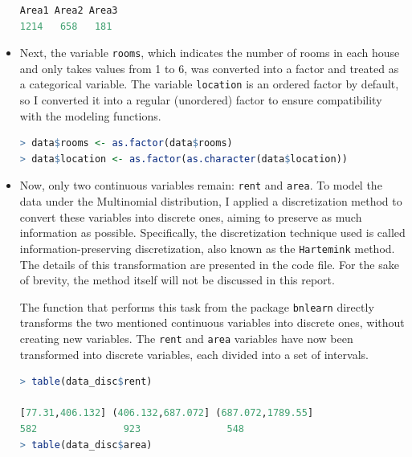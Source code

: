 \documentclass[15pt,a4paper]{report}
\begin{document}
\begin{itemize}
\begin{lstlisting}[language=R]
Area1 Area2 Area3 
1214   658   181 
	\end{lstlisting}
	\item Next, the variable \lstinline[language=R]|rooms|, which indicates the number of rooms in each house and only takes values from 1 to 6, was converted into a factor and treated as a categorical variable. The variable \lstinline[language=R]|location| is an ordered factor by default, so I converted it into a regular (unordered) factor to ensure compatibility with the modeling functions.
\begin{lstlisting}[language=R]
> data$rooms <- as.factor(data$rooms)
> data$location <- as.factor(as.character(data$location))
\end{lstlisting}
\item Now, only two continuous variables remain: \lstinline[language=R]|rent| and \lstinline[language=R]|area|. To model the data under the Multinomial distribution, I applied a discretization method to convert these variables into discrete ones, aiming to preserve as much information as possible. Specifically, the discretization technique used is called information-preserving discretization, also known as the \lstinline[language=R]|Hartemink| method. The details of this transformation are presented in the code file. For the sake of brevity, the method itself will not be discussed in this report. 

The function that performs this task from the package \lstinline[language=R]|bnlearn| directly transforms the two mentioned continuous variables into discrete ones, without creating new variables. The \lstinline[language=R]|rent| and \lstinline[language=R]|area| variables have now been transformed into discrete variables, each divided into a set of intervals.
\begin{lstlisting}[language=R]
> table(data_disc$rent)

[77.31,406.132] (406.132,687.072] (687.072,1789.55] 
582               923               548 
> table(data_disc$area)


\end{lstlisting}
\end{itemize}
\end{document}
